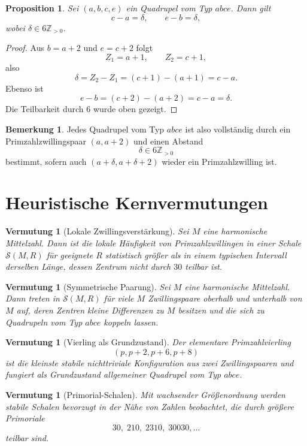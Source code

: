 \documentclass[11pt,a4paper]{article}
\theoremstyle{definition}
\newtheorem{remark}[definition]{Bemerkung}
\theoremstyle{plain}
\newtheorem{conjecture}[definition]{Vermutung}
\newtheorem{proposition}[definition]{Proposition}
\theoremstyle{remark}
\newcommand{\Z}{\mathbb{Z}}
\begin{document}
	\begin{proposition}
		Sei $(a,b,c,e)$ ein Quadrupel vom Typ $abce$. Dann gilt
		\[
		c-a=\delta,\qquad e-b=\delta,
		\]
		wobei $\delta\in 6\Z_{>0}$.
	\end{proposition}
	
	\begin{proof}
		Aus $b=a+2$ und $e=c+2$ folgt
		\[
		Z_1=a+1,\qquad Z_2=c+1,
		\]
		also
		\[
		\delta=Z_2-Z_1=(c+1)-(a+1)=c-a.
		\]
		Ebenso ist
		\[
		e-b=(c+2)-(a+2)=c-a=\delta.
		\]
		Die Teilbarkeit durch $6$ wurde oben gezeigt.
	\end{proof}
	
	\begin{remark}
		Jedes Quadrupel vom Typ $abce$ ist also vollständig durch ein Primzahlzwillingspaar $(a,a+2)$ und einen Abstand
		\[
		\delta\in 6\Z_{>0}
		\]
		bestimmt, sofern auch $(a+\delta,a+\delta+2)$ wieder ein Primzahlzwilling ist.
	\end{remark}
	
	\section{Heuristische Kernvermutungen}
	
	\begin{conjecture}[Lokale Zwillingsverstärkung]
		Sei $M$ eine harmonische Mittelzahl. 
		Dann ist die lokale Häufigkeit von Primzahlzwillingen in einer Schale $\mathcal S(M,R)$ für geeignete $R$ statistisch größer als in einem typischen Intervall derselben Länge, dessen Zentrum nicht durch $30$ teilbar ist.
	\end{conjecture}
	
	\begin{conjecture}[Symmetrische Paarung]
		Sei $M$ eine harmonische Mittelzahl. 
		Dann treten in $\mathcal S(M,R)$ für viele $M$ Zwillingspaare oberhalb und unterhalb von $M$ auf, deren Zentren kleine Differenzen zu $M$ besitzen und die sich zu Quadrupeln vom Typ $abce$ koppeln lassen.
	\end{conjecture}
	
	\begin{conjecture}[Vierling als Grundzustand]
		Der elementare Primzahlvierling
		\[
		(p,p+2,p+6,p+8)
		\]
		ist die kleinste stabile nichttriviale Konfiguration aus zwei Zwillingspaaren und fungiert als Grundzustand allgemeiner Quadrupel vom Typ $abce$.
	\end{conjecture}
	
	\begin{conjecture}[Primorial-Schalen]
		Mit wachsender Größenordnung werden stabile Schalen bevorzugt in der Nähe von Zahlen beobachtet, die durch größere Primoriale
		\[
		30,\;210,\;2310,\;30030,\dots
		\]
		teilbar sind.
	\end{conjecture}
	
\end{document}
